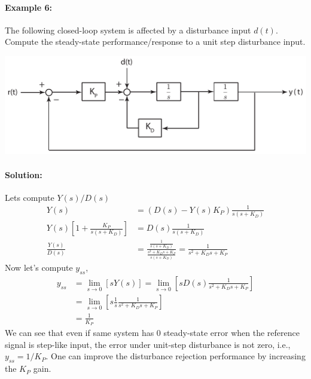 \documentclass[twoside]{article}
\begin{document}
\newpage

\paragraph{Example 6:} The following closed-loop system
is affected by a disturbance input $d(t)$. Compute the 
steady-state performance/response to a unit step disturbance 
input.

\begin{center}
\begin{minipage}[h]{0.8\linewidth}
    \begin{center}
      \includegraphics[width=\textwidth]{example4}
    \end{center}
\end{minipage}
\end{center}

\paragraph{Solution:} Lets compute $Y(s)/D(s)$
%
\begin{align*}
Y(s) &= \left( D(s) - Y(s) K_P \right) \frac{1}{s(s + K_D)} 
\\
Y(s) \left[ 1 + \frac{K_P}{s(s + K_D)}  \right] &= D(s) \frac{1}{s(s + K_D)} 
\\
\frac{Y(s)}{D(s)} &= \frac{\frac{1}{s(s + K_D)} }{\frac{s^2 + K_D s + K_P}{s(s + K_D)}}
= \frac{1}{s^2 + K_D s + K_P}
\end{align*}
%
 Now let's compute $y_{ss}$,
 \begin{align*} 
y_{ss} &= \lim_{s \to 0} [ s Y(s) ] = \lim_{s \to 0} \left[ s D(s) \frac{1}{s^2 + K_D s + K_P} \right]  
\\
&= \lim_{s \to 0} \left[ s \frac{1}{s} \frac{1}{s^2 + K_D s + K_P} \right]  
\\
&= \frac{1}{K_P}
 \end{align*}
%
We can see that even if same system has 0 steady-state error when the reference
signal is step-like input, the error under unit-step disturbance is not zero, i.e., $y_{ss} = 1 / K_P$.
One can improve the disturbance rejection performance by increasing the $K_P$ gain. 


\end{document}
